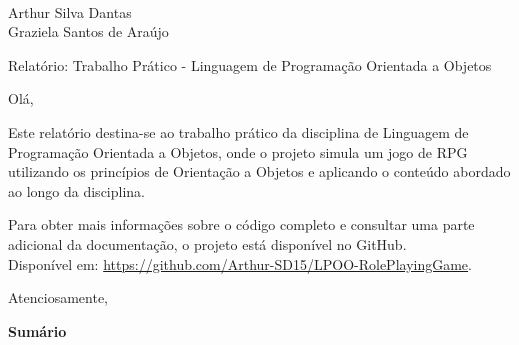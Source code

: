 \documentclass[11pt]{uiobrev}
\date{17 de Novembro de 2024}
\begin{document}
\begin{letter}{\\Arthur Silva Dantas \\ Graziela Santos de Araújo}

    \opening{Relatório: Trabalho Prático - Linguagem de Programação Orientada a Objetos}

    Olá,

    Este relatório destina-se ao trabalho prático da disciplina de Linguagem de Programação Orientada a Objetos, onde o projeto simula um jogo de RPG utilizando os princípios de Orientação a Objetos e aplicando o conteúdo abordado ao longo da disciplina.

    \bigskip
    Para obter mais informações sobre o código completo e consultar uma parte adicional da documentação, o projeto está disponível no GitHub. 
    \\ Disponível em: \url{https://github.com/Arthur-SD15/LPOO-RolePlayingGame}.

    \closing{Atenciosamente,}
\thispagestyle{empty} 
\end{letter}

\newpage

\begin{center}
    \Large \textbf{Sumário}
\end{center}
\vspace{1cm}
\end{document}
